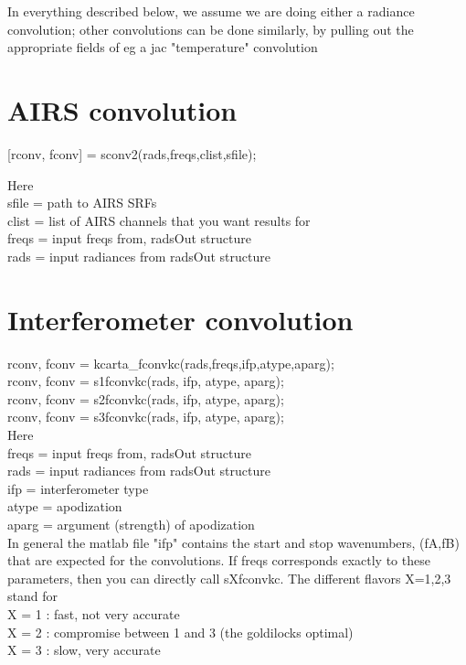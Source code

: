 \documentclass[12pt]{article}
\begin{document}
In everything described below, we assume we are doing either a radiance
convolution; other convolutions can be done similarly, by pulling out 
the appropriate fields of eg a jac "temperature" convolution

\section{AIRS convolution}
[rconv, fconv] = sconv2(rads,freqs,clist,sfile);

Here \\
sfile = path to AIRS SRFs\\
clist = list of AIRS channels that you want results for\\
freqs = input freqs from, radsOut structure\\
rads  = input radiances from radsOut structure\\

\section{Interferometer convolution}
rconv, fconv = kcarta\_fconvkc(rads,freqs,ifp,atype,aparg); \\
rconv, fconv = s1fconvkc(rads, ifp, atype, aparg); \\      
rconv, fconv = s2fconvkc(rads, ifp, atype, aparg); \\      
rconv, fconv = s3fconvkc(rads, ifp, atype, aparg); \\      

Here \\
freqs = input freqs from, radsOut structure\\
rads  = input radiances from radsOut structure\\
ifp = interferometer type\\
atype = apodization\\
aparg = argument (strength) of apodization\\

In general the matlab file "ifp" contains the start and stop wavenumbers,
(fA,fB) that are expected for the convolutions. If freqs corresponds exactly
to these parameters, then you can directly call sXfconvkc. The different 
flavors X=1,2,3 stand for \\
X = 1 : fast, not very accurate\\
X = 2 : compromise between 1 and 3 (the goldilocks optimal)\\
X = 3 : slow, very accurate\\
\end{document}
